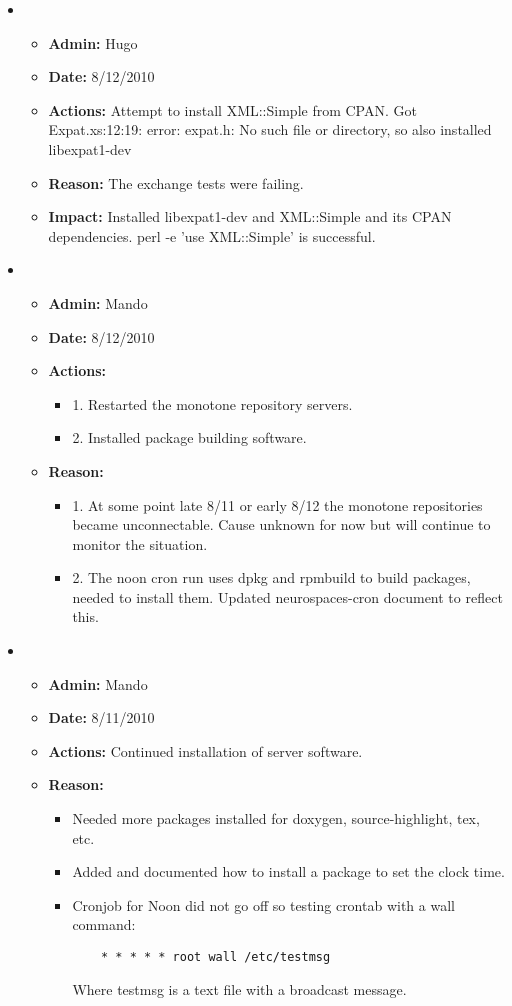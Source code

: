 \documentclass[12pt]{article}
\begin{document}
\begin{itemize}
\item 
\begin{itemize}
\item[] {\bf Admin:} Hugo
\item[] {\bf Date:} 8/12/2010 
\item[] {\bf Actions:} Attempt to install XML::Simple from CPAN.
Got Expat.xs:12:19: error: expat.h: No such file or directory, so also installed libexpat1-dev

\item[] {\bf Reason:} The exchange tests were failing.
\item[] {\bf Impact:} Installed libexpat1-dev and XML::Simple and its
  CPAN dependencies.  perl -e 'use XML::Simple' is successful.
\end{itemize}

\item 
\begin{itemize}
\item[] {\bf Admin:} Mando
\item[] {\bf Date:} 8/12/2010 
\item[] {\bf Actions:} 
\begin{itemize}
	\item[] 1. Restarted the monotone repository servers.
	\item[] 2. Installed package building software.
\end{itemize}
\item[] {\bf Reason:} 
\begin{itemize}
	\item[] 1. At some point late 8/11 or early 8/12 the monotone repositories became unconnectable. Cause unknown for now but will continue to monitor the situation.
	\item[] 2. The noon cron run uses dpkg and rpmbuild to build packages, needed to install them. Updated neurospaces-cron document to reflect this.
\end{itemize}
\end{itemize}

\item 
\begin{itemize}
\item[] {\bf Admin:} Mando
\item[] {\bf Date:} 8/11/2010 
\item[] {\bf Actions:} Continued installation of server software.
\item[] {\bf Reason:} 
\begin{itemize}
\item[] Needed more packages installed for doxygen, source-highlight, tex, etc. 
\item[] Added and documented how to install a package to set the clock time.
\item[] Cronjob for Noon did not go off so testing crontab with a wall command:
\begin{verbatim}
	* * * * * root wall /etc/testmsg
\end{verbatim}
Where testmsg is a text file with a broadcast message.
\end{itemize}
	

\end{itemize}
\end{itemize}
\end{document}
